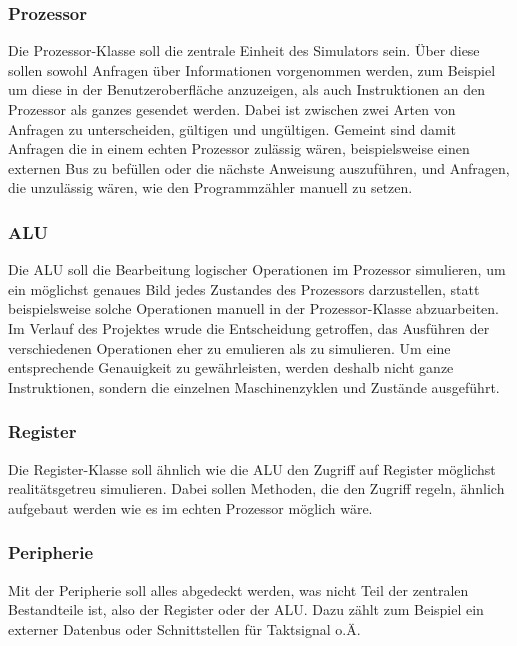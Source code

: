 \documentclass[12pt]{article}
\begin{document}
\subsubsection{Prozessor}
Die Prozessor-Klasse soll die zentrale Einheit des Simulators sein. Über diese sollen sowohl Anfragen über Informationen vorgenommen werden, zum Beispiel um diese in der Benutzeroberfläche anzuzeigen, als auch Instruktionen an den Prozessor als ganzes gesendet werden. Dabei ist zwischen zwei Arten von Anfragen zu unterscheiden, gültigen und ungültigen. Gemeint sind damit Anfragen die in einem echten Prozessor zulässig wären, beispielsweise einen externen Bus zu befüllen oder die nächste Anweisung auszuführen, und Anfragen, die unzulässig wären, wie den Programmzähler manuell zu setzen.

\subsubsection{ALU}
Die ALU soll die Bearbeitung logischer Operationen im Prozessor simulieren, um ein möglichst genaues Bild jedes Zustandes des Prozessors darzustellen, statt beispielsweise solche Operationen manuell in der Prozessor-Klasse abzuarbeiten. Im Verlauf des Projektes wrude die Entscheidung getroffen, das Ausführen der verschiedenen Operationen eher zu emulieren als zu simulieren. Um eine entsprechende Genauigkeit zu gewährleisten, werden deshalb nicht ganze Instruktionen, sondern die einzelnen Maschinenzyklen und Zustände ausgeführt.

\subsubsection{Register}
Die Register-Klasse soll ähnlich wie die ALU den Zugriff auf Register möglichst realitätsgetreu simulieren. Dabei sollen Methoden, die den Zugriff regeln, ähnlich aufgebaut werden wie es im echten Prozessor möglich wäre.

\subsubsection{Peripherie}
Mit der Peripherie soll alles abgedeckt werden, was nicht Teil der zentralen Bestandteile ist, also der Register oder der ALU. Dazu zählt zum Beispiel ein externer Datenbus oder Schnittstellen für Taktsignal o.Ä.
\end{document}

